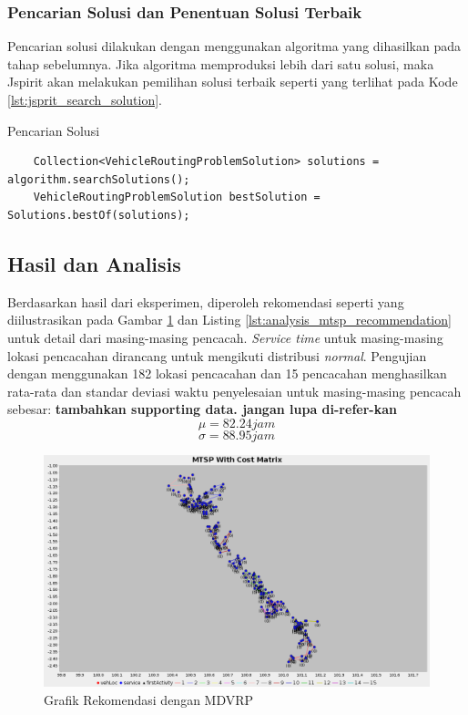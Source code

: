 \subsubsection{Pencarian Solusi dan Penentuan Solusi Terbaik}
Pencarian solusi dilakukan dengan menggunakan algoritma yang dihasilkan pada tahap sebelumnya. Jika algoritma memproduksi lebih dari satu solusi, maka Jspirit akan melakukan pemilihan solusi terbaik seperti yang terlihat pada Kode \ref{lst:jsprit_search_solution}. 


\begin{listing}[!]
	\caption{Pencarian Solusi}
	\label{lst:jsprit_search_solution}
	\begin{verbatim}
	Collection<VehicleRoutingProblemSolution> solutions = algorithm.searchSolutions();
	VehicleRoutingProblemSolution bestSolution = Solutions.bestOf(solutions);
	\end{verbatim}
\end{listing}


\subsection{Hasil dan Analisis}
\label{ssec:hasil-analisis}
Berdasarkan hasil dari eksperimen, diperoleh rekomendasi seperti yang diilustrasikan pada Gambar \ref{fig:analysis_mtsp_recommendation} dan Listing \ref{lst:analysis_mtsp_recommendation} untuk detail dari masing-masing pencacah. \textit{Service time} untuk masing-masing lokasi pencacahan dirancang untuk mengikuti distribusi \textit{normal}. Pengujian dengan menggunakan 182 lokasi pencacahan dan 15 pencacahan menghasilkan rata-rata dan standar deviasi waktu penyelesaian untuk masing-masing pencacah sebesar:   \color{red} \textbf{tambahkan supporting data. jangan lupa di-refer-kan}	\color{black}
$$ \mu = 82.24 jam $$
$$ \sigma = 88.95 jam $$


\begin{figure}[!]
	\centering
	\includegraphics[width=\textwidth]{Resources/Images/analysis_mtsp_no_time_windows}
	\caption{Grafik Rekomendasi dengan MDVRP}
	\label{fig:analysis_mtsp_recommendation}
\end{figure}


